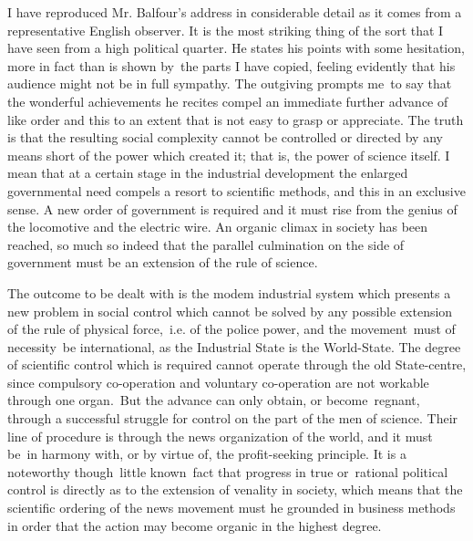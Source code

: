 \documentclass[openany,nobib]{tufte-book}
\begin{document}
I have reproduced Mr. Balfour's address in considerable detail as it
comes from a representative English observer. It is the most striking
thing of the sort that I have seen from a high political quarter. He
states his points with some hesitation, more in fact than is shown
by~the parts I have copied, feeling evidently that his audience might
not be in full sympathy. The outgiving prompts me~to say that the
wonderful achievements he recites compel an immediate further advance of
like order and this to an extent that is not easy to grasp or
appreciate. The truth is that the resulting social complexity cannot be
controlled or directed by any means short of the power which created it;
that is, the power of science itself. I mean that at a certain stage in
the industrial development the enlarged governmental need compels a
resort to scientific methods, and this in an exclusive sense. A new
order of government is required and it must rise from the genius of the
locomotive and the electric wire. An organic climax in society has been
reached, so much so indeed that the parallel culmination on the side of
government must be an extension of the rule of science.~

The outcome to be dealt with is the modem industrial system which
presents a new problem in social control which cannot be solved by any
possible extension of the rule of physical force,~i.e. of the police
power, and the movement~must of necessity~be international, as the
Industrial State is the World-State. The degree of scientific control
which is required cannot operate through the old State-centre, since
compulsory co-operation and voluntary co-operation are not workable
through one organ.~But the advance can only obtain, or become~regnant,
through a successful struggle for control on the part of the men of
science. Their line of procedure is through the news organization of the
world, and it must be~in harmony with, or by virtue of, the
profit-seeking principle. It is a noteworthy though~little known~fact
that progress in true or~rational political control is directly as to
the extension of venality in society, which means that the scientific
ordering of the news movement must he grounded in business methods in
order that the action may become organic in the highest degree.~
\end{document}
